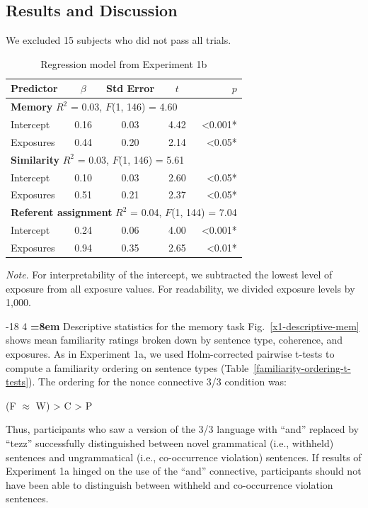 \documentclass[man,longtable,floatsintext]{my-apa6}
\makeatletter
\renewcommand\subsubsection{\@startsection{subsubsection}{3}{\z@}%
                       {-18\p@ \@plus -4\p@ \@minus -4\p@}%
                       {4\p@ \@plus 2\p@ \@minus 2\p@}%
                       {\normalfont\normalsize\bfseries\boldmath
                        \rightskip=\z@ \@plus 8em\pretolerance=10000 }}
\makeatother
\begin{document}
\subsection{Results and Discussion}
We excluded 15 subjects who did not pass all trials.

\begin{table}[t]
  \caption{Regression model from Experiment 1b}
  \label{fig:expt1b-regression}
  \begin{threeparttable}
    \begin{tabular}{l c c c r}
      \hline
      Predictor & $\beta$ & Std Error & $t$ & $p$ \\
      \hline
      \multicolumn{5}{l}{\small{\textbf{Memory} $R^2$ = 0.03, $F$(1, 146) = 4.60}}\\
      Intercept & 0.16 & 0.03 & 4.42 & <0.001*\\
      Exposures & 0.44 & 0.20 & 2.14 & <0.05* \\
      \hline
      \multicolumn{5}{l}{\small{\textbf{Similarity} $R^2$ = 0.03, $F$(1, 146) = 5.61}}\\
      Intercept & 0.10 & 0.03 & 2.60 & <0.05*\\
      Exposures & 0.51 & 0.21 & 2.37 & <0.05* \\
      \hline
      \multicolumn{5}{l}{\small{\textbf{Referent assignment} $R^2$ = 0.04, $F$(1, 144) = 7.04}}\\
      Intercept & 0.24 & 0.06 & 4.00 & <0.001*\\
      Exposures & 0.94 & 0.35 & 2.65 & <0.01* \\
      \hline
    \end{tabular}
    \begin{tablenotes}
    \item \footnotesize{\emph{Note}. For interpretability of the intercept, we subtracted the lowest level of exposure from all exposure values. For readability, we divided exposure levels by 1,000.}
    \end{tablenotes}
  \end{threeparttable}
\end{table}

\subsubsection{Descriptive statistics for the memory task}
Fig.~\ref{x1-descriptive-mem} shows mean familiarity ratings broken down by sentence type, coherence, and exposures. As in Experiment 1a, we used Holm-corrected pairwise t-tests to compute a familiarity ordering on sentence types (Table~\ref{familiarity-ordering-t-tests}). The ordering for the nonce connective 3/3 condition was:
\begin{center}
  (F $\approx$ W) > C > P
\end{center}
\noindent Thus, participants who saw a version of the 3/3 language with ``and'' replaced by ``tezz'' successfully distinguished between novel grammatical (i.e., withheld) sentences and ungrammatical (i.e., co-occurrence violation) sentences. If results of Experiment 1a hinged on the use of the ``and'' connective, participants should not have been able to distinguish between withheld and co-occurrence violation sentences.
\end{document}
